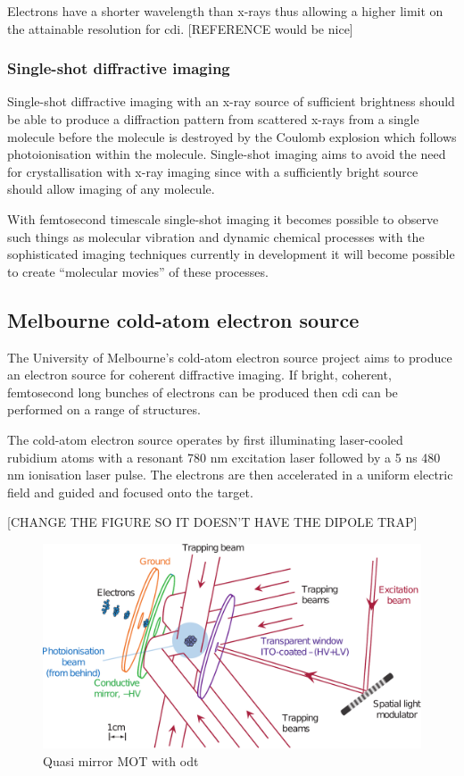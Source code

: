 Electrons have a shorter wavelength than x-rays thus allowing a higher limit on the attainable resolution for \gls{cdi}. [REFERENCE would be nice] 

\subsubsection{Single-shot diffractive imaging}
Single-shot diffractive imaging with an x-ray source of sufficient brightness should be able to produce a diffraction pattern from scattered x-rays from a single molecule before the molecule is destroyed by the Coulomb explosion which follows photoionisation within the molecule\cite{henderson_potential_1995, neutze_potential_2000}. Single-shot imaging aims to avoid the need for crystallisation with x-ray imaging since with a sufficiently bright source should allow imaging of any molecule.

With femtosecond timescale single-shot imaging it becomes possible to observe such things as molecular vibration and dynamic chemical processes\cite{zewail_4d_2006} with the sophisticated imaging techniques currently in development it will become possible to create ``molecular movies''\cite{dwyer_femtosecond_2006} of these processes.

\subsection{Melbourne cold-atom electron source}
The University of Melbourne's cold-atom electron source project aims to produce an electron source for coherent diffractive imaging. If bright, coherent, femtosecond long bunches of electrons can be produced then \gls{cdi} can be performed on a range of structures.

The cold-atom electron source operates by first illuminating laser-cooled rubidium atoms with a resonant 780 nm excitation laser followed by a 5 ns 480 nm ionisation laser pulse. The electrons are then accelerated in a uniform electric field and guided and focused onto the target.

[CHANGE THE FIGURE SO IT DOESN'T HAVE THE DIPOLE TRAP]
\begin{figure}[h]
	\centering
	\includegraphics[scale=0.32]{figs/MOT.pdf}
	\caption[Title]{Quasi mirror MOT with \gls{odt}}
	\label{figs/MOT.pdf}
\end{figure}


